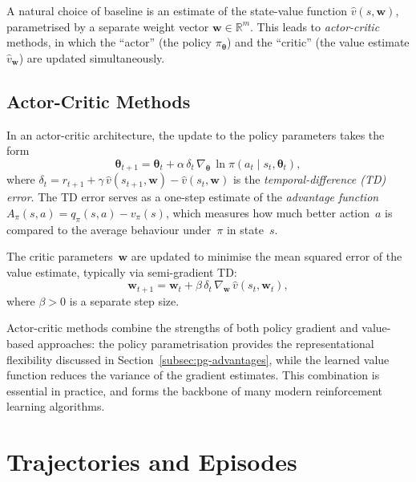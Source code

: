 \documentclass[a4paper,oneside,11pt]{report}
\begin{document}
A natural choice of baseline is an estimate of the state-value function $\hat{v}(s,\bm{w})$, parametrised by a separate weight vector $\bm{w}\in\mathbb{R}^m$. This leads to \emph{actor-critic} methods, in which the ``actor'' (the policy $\pi_{\bm{\theta}}$) and the ``critic'' (the value estimate $\hat{v}_{\bm{w}}$) are updated simultaneously.

\subsection{Actor-Critic Methods}
\label{subsec:actor-critic}

In an actor-critic architecture, the update to the policy parameters takes the form
\begin{equation}\label{eq:actor-critic-update}
  \bm{\theta}_{t+1} = \bm{\theta}_t + \alpha\, \delta_t\, \nabla_{\bm{\theta}}\,\ln\pi(a_t\mid s_t,\bm{\theta}_t),
\end{equation}
where $\delta_t = r_{t+1} + \gamma\,\hat{v}(s_{t+1},\bm{w}) - \hat{v}(s_t,\bm{w})$ is the \emph{temporal-difference (TD) error}. The TD error serves as a one-step estimate of the \emph{advantage function} $A_\pi(s,a) = q_\pi(s,a) - v_\pi(s)$, which measures how much better action~$a$ is compared to the average behaviour under~$\pi$ in state~$s$.

The critic parameters~$\bm{w}$ are updated to minimise the mean squared error of the value estimate, typically via semi-gradient TD:
\begin{equation}\label{eq:critic-update}
  \bm{w}_{t+1} = \bm{w}_t + \beta\, \delta_t\, \nabla_{\bm{w}}\,\hat{v}(s_t,\bm{w}_t),
\end{equation}
where $\beta>0$ is a separate step size.

Actor-critic methods combine the strengths of both policy gradient and value-based approaches: the policy parametrisation provides the representational flexibility discussed in Section~\ref{subsec:pg-advantages}, while the learned value function reduces the variance of the gradient estimates. This combination is essential in practice, and forms the backbone of many modern reinforcement learning algorithms.

\section{Trajectories and Episodes}
\label{sec:trajectories}
\end{document}
